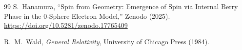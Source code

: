 \documentclass[%
 reprint,
 amsmath,amssymb,
 aps,
 prb,
]{revtex4-2}
\numberwithin{equation}{section}
\begin{document}
\begin{thebibliography}{99}
S.~Hanamura,
``Spin from Geometry: Emergence of Spin via Internal Berry Phase in the 0-Sphere Electron Model,''
Zenodo (2025).
\href{https://doi.org/10.5281/zenodo.17765409}{https://doi.org/10.5281/zenodo.17765409}

R.~M.~Wald,
\textit{General Relativity},
University of Chicago Press (1984).


\end{thebibliography}


\end{document}
